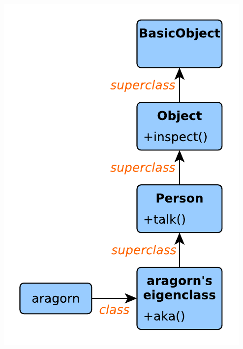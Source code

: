 \begin{frame}[fragile]
\begin{columns}[c]
\pause

\begin{column}{5.5cm}
\includegraphics[scale=0.55]{diagrams/object_lookup_path2.pdf}
\end{column}

\end{columns}

\end{frame}




